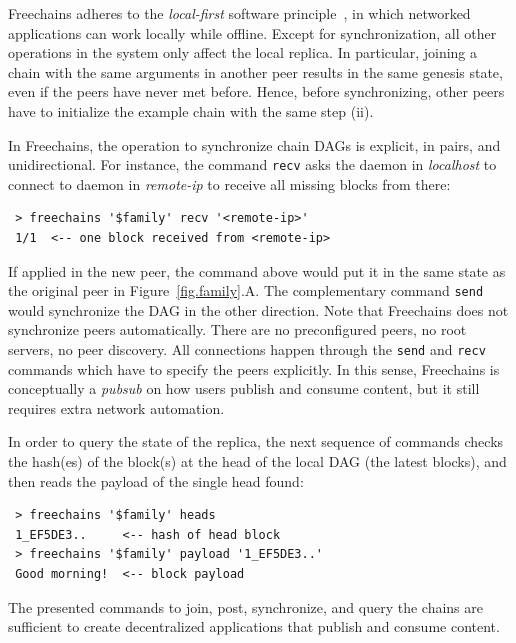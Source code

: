 \documentclass[12pt]{article}
\newcommand{\FC}       {Freechains\xspace}
\newcommand{\code}[1]  {\texttt{\footnotesize{#1}}}
\begin{document}
\FC adheres to the \emph{local-first} software principle~\cite{p2p.local}, in
which networked applications can work locally while offline.
Except for synchronization, all other operations in the system only affect the
local replica.
In particular, joining a chain with the same arguments in another peer results
in the same genesis state, even if the peers have never met before.
Hence, before synchronizing, other peers have to initialize the example chain
with the same step (ii).

In \FC, the operation to synchronize chain DAGs is explicit, in pairs, and
unidirectional.
For instance, the command \code{recv} asks the daemon in \emph{localhost} to
connect to daemon in \emph{remote-ip} to receive all missing blocks from there:

{\footnotesize
\begin{verbatim}
 > freechains '$family' recv '<remote-ip>'
 1/1  <-- one block received from <remote-ip>
\end{verbatim}
}

If applied in the new peer, the command above would put it in the same state as
the original peer in Figure~\ref{fig.family}.A.
The complementary command \code{send} would synchronize the DAG in the other
direction.
Note that \FC does not synchronize peers automatically.
There are no preconfigured peers, no root servers, no peer discovery.
All connections happen through the \code{send} and \code{recv} commands which
have to specify the peers explicitly.
In this sense, \FC is conceptually a \emph{pubsub} on how users publish and
consume content, but it still requires extra network automation.

In order to query the state of the replica, the next sequence of commands
checks the hash(es) of the block(s) at the head of the local DAG (the latest
blocks), and then reads the payload of the single head found:


{\footnotesize
\begin{verbatim}
 > freechains '$family' heads
 1_EF5DE3..     <-- hash of head block
 > freechains '$family' payload '1_EF5DE3..'
 Good morning!  <-- block payload
\end{verbatim}
}

The presented commands to join, post, synchronize, and query the chains are
sufficient to create decentralized applications that publish and consume
content.
\end{document}
